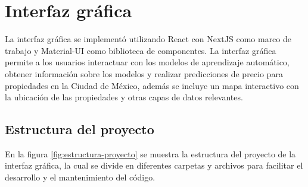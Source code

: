 \section{Interfaz gráfica}
La interfaz gráfica se implementó utilizando React con NextJS como marco de trabajo y
Material-UI como biblioteca de componentes. La interfaz gráfica permite a los
usuarios interactuar con los modelos de aprendizaje automático, obtener
información sobre los modelos y realizar predicciones de precio para propiedades
en la Ciudad de México, además se incluye un mapa interactivo con la ubicación de
las propiedades y otras capas de datos relevantes.

\subsection{Estructura del proyecto}
En la figura \ref{fig:estructura-proyecto} se muestra la estructura del proyecto
de la interfaz gráfica, la cual se divide en diferentes carpetas y archivos para
facilitar el desarrollo y el mantenimiento del código.

